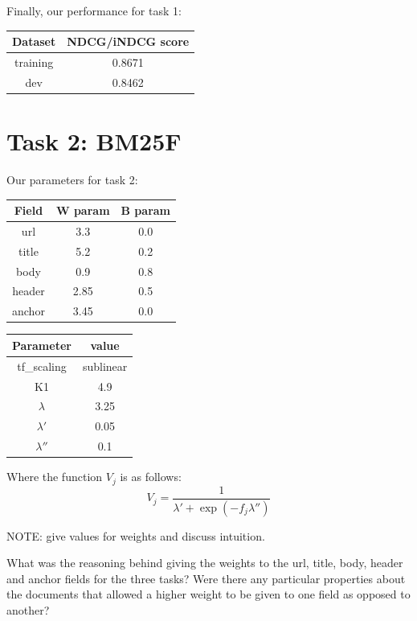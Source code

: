 \documentclass[10pt,twocolumn]{article}
\begin{document}
Finally, our performance for task 1:
\begin{table}[H]
\centering
\begin{tabular}{|c|c|}
\hline
Dataset & NDCG/iNDCG score \\\hline
training & 0.8671\\\hline
dev & 0.8462\\\hline
\end{tabular}
\end{table}

\section*{Task 2: BM25F}
Our parameters for task 2:
\begin{table}[H]
\centering
\begin{tabular}{|c|c|c|}
\hline
Field & W param & B param\\\hline
url & 3.3 & 0.0\\\hline
title & 5.2 & 0.2\\\hline
body & 0.9 & 0.8\\\hline
header & 2.85 & 0.5 \\\hline
anchor & 3.45 & 0.0\\\hline
\end{tabular}
\end{table}
\begin{table}[H]
\centering
\begin{tabular}{|c|c|}
\hline
Parameter & value\\\hline
tf\_scaling & sublinear\\\hline
K1 & 4.9\\\hline
$\lambda$ & 3.25\\\hline
$\lambda'$ & 0.05\\\hline
$\lambda''$ & 0.1\\\hline
\end{tabular}
\end{table}
Where the function $V_j$ is as follows:
\begin{equation*}
V_j = \frac{1}{\lambda'+\exp({-f_j\lambda''})}
\end{equation*}

NOTE: give values for weights and discuss intuition.

What was the reasoning behind giving the weights to the url, title,
body, header and anchor fields for the three tasks? Were there any
particular properties about the documents that allowed a higher weight
to be given to one field as opposed to another?
\end{document}
